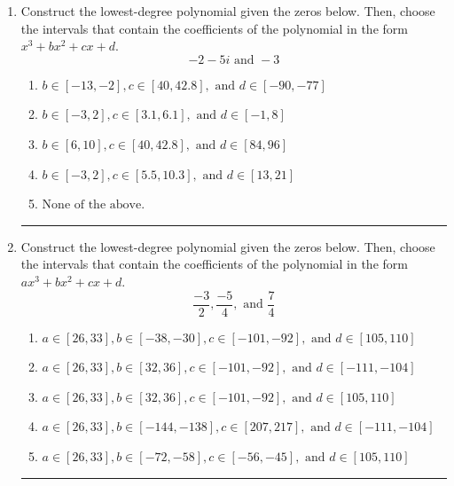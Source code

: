 \documentclass[14pt]{extbook}
\newcommand{\litem}[1]{\item#1\hspace*{-1cm}\rule{\textwidth}{0.4pt}}
\begin{document}
\begin{enumerate}
\litem{
Construct the lowest-degree polynomial given the zeros below. Then, choose the intervals that contain the coefficients of the polynomial in the form $x^3+bx^2+cx+d$.\[ -2 - 5 i \text{ and } -3 \]\begin{enumerate}[label=\Alph*.]
\item \( b \in [-13, -2], c \in [40, 42.8], \text{ and } d \in [-90, -77] \)
\item \( b \in [-3, 2], c \in [3.1, 6.1], \text{ and } d \in [-1, 8] \)
\item \( b \in [6, 10], c \in [40, 42.8], \text{ and } d \in [84, 96] \)
\item \( b \in [-3, 2], c \in [5.5, 10.3], \text{ and } d \in [13, 21] \)
\item \( \text{None of the above.} \)

\end{enumerate} }
\litem{
Construct the lowest-degree polynomial given the zeros below. Then, choose the intervals that contain the coefficients of the polynomial in the form $ax^3+bx^2+cx+d$.\[ \frac{-3}{2}, \frac{-5}{4}, \text{ and } \frac{7}{4} \]\begin{enumerate}[label=\Alph*.]
\item \( a \in [26, 33], b \in [-38, -30], c \in [-101, -92], \text{ and } d \in [105, 110] \)
\item \( a \in [26, 33], b \in [32, 36], c \in [-101, -92], \text{ and } d \in [-111, -104] \)
\item \( a \in [26, 33], b \in [32, 36], c \in [-101, -92], \text{ and } d \in [105, 110] \)
\item \( a \in [26, 33], b \in [-144, -138], c \in [207, 217], \text{ and } d \in [-111, -104] \)
\item \( a \in [26, 33], b \in [-72, -58], c \in [-56, -45], \text{ and } d \in [105, 110] \)


\end{enumerate}}
\end{enumerate}
\end{document}
